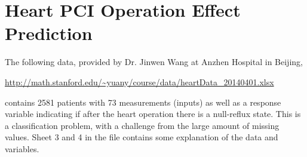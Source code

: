 \documentclass[11pt]{article}
\begin{document}
%
%
%
%
%
%
%
% 
%
%
%
%
%
%

\section{Heart PCI Operation Effect Prediction}

The following data, provided by Dr. Jinwen Wang at Anzhen Hospital in Beijing, 

\url{http://math.stanford.edu/~yuany/course/data/heartData_20140401.xlsx}

\noindent contains 2581 patients with 73 measurements (inputs) as well as a response variable indicating if after the heart operation there is a null-reflux state. This is a classification problem, with a challenge from the large amount of missing values. Sheet 3 and 4 in the file contains some explanation of the data and variables. 
\end{document}
